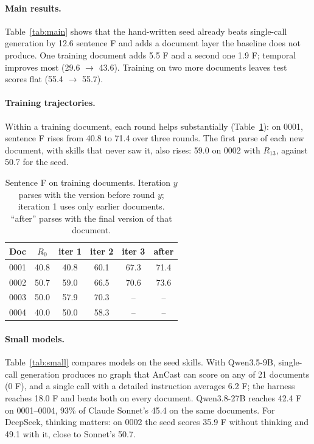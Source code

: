 \documentclass[11pt]{article}
\begin{document}
\paragraph{Main results.}
Table~\ref{tab:main} shows that the hand-written seed already beats single-call generation by 12.6 sentence F and adds a document layer the baseline does not produce. One training document adds 5.5 F and a second one 1.9 F; temporal improves most (29.6 $\rightarrow$ 43.6). Training on two more documents leaves test scores flat (55.4 $\rightarrow$ 55.7).

\paragraph{Training trajectories.}
Within a training document, each round helps substantially (Table~\ref{tab:train}): on 0001, sentence F rises from 40.8 to 71.4 over three rounds. The first parse of each new document, with skills that never saw it, also rises: 59.0 on 0002 with $R_{13}$, against 50.7 for the seed.

\begin{table}[t]
\centering\small
\setlength{\tabcolsep}{4pt}
\begin{tabular}{@{}lccccc@{}}
\toprule
Doc & $R_0$ & iter 1 & iter 2 & iter 3 & after \\
\midrule
0001 & 40.8 & 40.8 & 60.1 & 67.3 & 71.4 \\
0002 & 50.7 & 59.0 & 66.5 & 70.6 & 73.6 \\
0003 & 50.0 & 57.9 & 70.3 & -- & -- \\
0004 & 40.0 & 50.0 & 58.3 & -- & -- \\
\bottomrule
\end{tabular}
\caption{Sentence F on training documents. Iteration $y$ parses with the version before round $y$; iteration 1 uses only earlier documents. ``after'' parses with the final version of that document.}
\label{tab:train}
\end{table}

\paragraph{Small models.}
Table~\ref{tab:small} compares models on the seed skills. With Qwen3.5-9B, single-call generation produces no graph that AnCast can score on any of 21 documents (0 F), and a single call with a detailed instruction averages 6.2 F; the harness reaches 18.0 F and beats both on every document. Qwen3.8-27B reaches 42.4 F on 0001--0004, 93\% of Claude Sonnet's 45.4 on the same documents. For DeepSeek, thinking matters: on 0002 the seed scores 35.9 F without thinking and 49.1 with it, close to Sonnet's 50.7.
\end{document}
